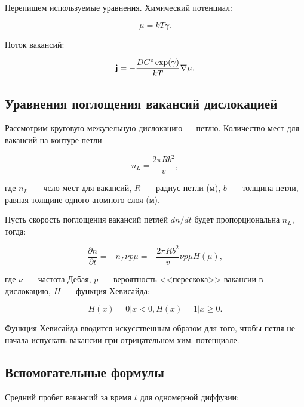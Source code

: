 \documentclass[12pt, a4paper]{article}
\begin{document}
Перепишем используемые уравнения. Химический потенциал:

\begin{equation}
\label{eq_mu_gamma}
\mu = kT \gamma.
\end{equation}

Поток вакансий:

\begin{equation}
\label{eq_fik}
{\bf j}=-\frac{DC^e \exp(\gamma)}{kT}\nabla \mu.
\end{equation}

\subsection{Уравнения поглощения вакансий дислокацией}

Рассмотрим круговую межузельную дислокацию --- петлю. Количество мест для вакансий на контуре петли

\begin{equation}
\label{eq_vacs_on_dislo}
n_L = \frac{2 \pi R b^2}{v},
\end{equation}

\noindent где $n_L$~--- чсло мест для вакансий, $R$~--- радиус петли (м), $b$~--- толщина петли, равная толщине одного атомного слоя (м).

Пусть скорость поглощения вакансий петлёй $dn/dt$ будет пропорциональна $n_L$, тогда:

\begin{equation}
\label{eq_dn_dt}
\frac{\partial n}{\partial t} = -n_L \nu p \mu = -\frac{2 \pi R b^2}{v} \nu p \mu H(\mu),
\end{equation}

\noindent где $\nu$~--- частота Дебая, $p$~--- вероятность <<перескока>> вакансии в дислокацию, $H$~--- функция Хевисайда:

\begin{equation}
H(x) = 0 | x < 0, H(x) = 1 | x \ge 0.
\end{equation}

Функция Хевисайда вводится искусственным образом для того, чтобы петля не начала испускать вакансии при отрицательном хим. потенциале.

\subsection{Вспомогательные формулы}

Средний пробег вакансий за время $t$ для одномерной диффузии:
\end{document}
